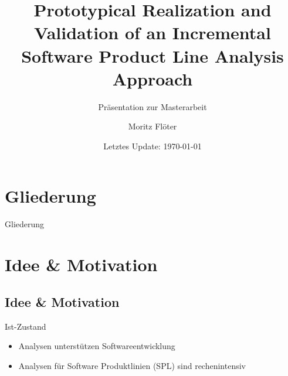 \documentclass[compress, aspectratio=43, noserifmath]{beamer}
\title{Prototypical Realization and Validation of an Incremental Software Product Line Analysis Approach}
\subtitle{Pr\"asentation zur Masterarbeit}
\date{Letztes Update: \today}
\author{Moritz Fl\"oter}
\institute{\textbf{Universit\"at Hildesheim}}
\begin{document}

\maketitle


\section*{Gliederung}
\begin{frame}{Gliederung}
	\tableofcontents[hideallsubsections]

\end{frame}


\section{Idee \& Motivation}
\subsection{Idee \& Motivation}

\begin{frame}{Ist-Zustand}
\begin{itemize}
        \item[\textbullet] Analysen unterst\"utzen Softwareentwicklung
        \item[\textbullet] Analysen f\"ur Software Produktlinien (SPL) sind rechenintensiv
\end{itemize}
\end{frame}
\end{document}
